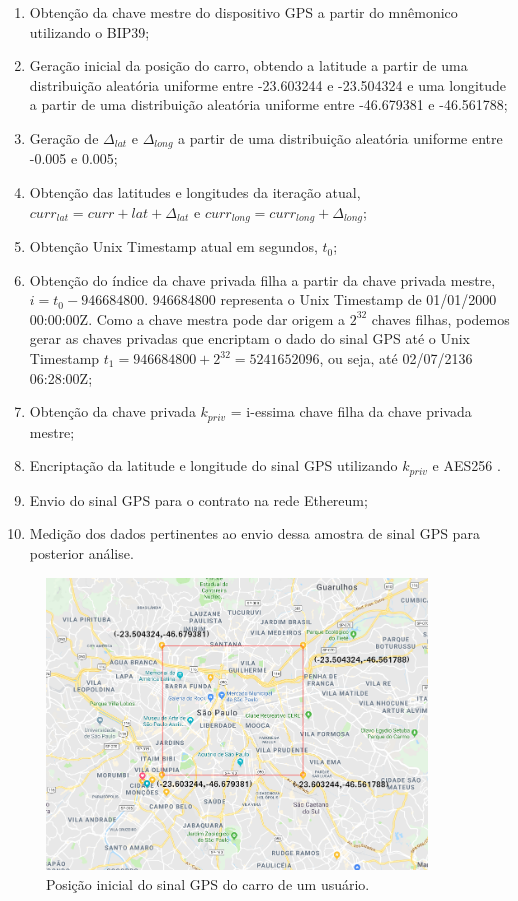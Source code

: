 \begin{enumerate}
\item Obtenção da chave mestre do dispositivo GPS a partir do mnêmonico utilizando o BIP39;
\item Geração inicial da posição do carro, obtendo a latitude a partir de uma distribuição aleatória uniforme entre -23.603244 e -23.504324 e uma longitude a partir de uma distribuição aleatória uniforme entre -46.679381 e -46.561788;
\item Geração de \(\Delta_{lat}\) e \(\Delta_{long}\) a partir de uma distribuição aleatória uniforme entre -0.005 e 0.005;
\item Obtenção das latitudes e longitudes da iteração atual, \(curr_{lat} = curr+{lat} + \Delta_{lat}\) e \(curr_{long} = curr_{long} + \Delta_{long}\);
\item Obtenção Unix Timestamp atual em segundos, \(t_{0}\);
\item Obtenção do índice da chave privada filha a partir da chave privada mestre, \(i = t_{0} - 946684800\). 946684800 representa o Unix Timestamp de 01/01/2000 00:00:00Z. Como a chave mestra pode dar origem a \(2^{32}\) chaves filhas, podemos gerar as chaves privadas que encriptam o dado do sinal GPS até o Unix Timestamp \(t_{1} = 946684800 + 2^{32} = 5241652096\), ou seja, até 02/07/2136 06:28:00Z;
\item Obtenção da chave privada \(k_{priv}\) = i-essima chave filha da chave privada mestre;
\item Encriptação da latitude e longitude do sinal GPS utilizando \(k_{priv}\) e AES256 \cite{aes}.
\item Envio do sinal GPS para o contrato na rede Ethereum;
\item Medição dos dados pertinentes ao envio dessa amostra de sinal GPS para posterior análise.
\end{enumerate}

\begin{figure}[h!]
\centering
\includegraphics[width=0.9\textwidth]{Cap2/gps_location_generator}
\caption{Posição inicial do sinal GPS do carro de um usuário.}
\label{gps_location_generator}
\end{figure}

